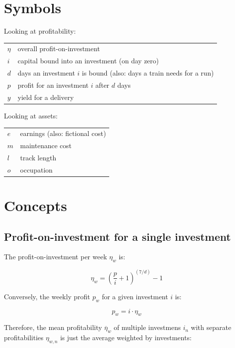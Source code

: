 \documentclass[12pt]{article}
\begin{document}
\section{Symbols}

\noindent Looking at profitability:

\begin{tabular}{ll}
  $\eta$    & overall profit-on-investment \\
  $i$       & capital bound into an investment (on day zero) \\
  $d$       & days an investment $i$ is bound (also: days a train needs for a run) \\
  $p$       & profit for an investment $i$ after $d$ days \\
  $y$       & yield for a delivery
\end{tabular}

\noindent Looking at assets:

\begin{tabular}{ll}
  $e$    & earnings (also: fictional cost) \\
  $m$    & maintenance cost \\
  $l$    & track length \\
  $o$    & occupation
\end{tabular}


\section{Concepts}


\subsection{Profit-on-investment for a single investment}

The profit-on-investment per week $\eta_w$ is:

\begin{equation}
  \eta_w = \left(\frac{p}{i}+1\right)^{\left(7/d\right)}-1 \label{eq:weekly_profit}
\end{equation}

Conversely, the weekly profit $p_w$ for a given investment $i$ is:

\begin{equation}
  p_w = i \cdot \eta_w
\end{equation}

Therefore, the mean profitability $\overline\eta_w$ of multiple investmens $i_n$ with
separate profitabilities $\eta_{w,n}$ is just the average weighted by investments:
\end{document}
